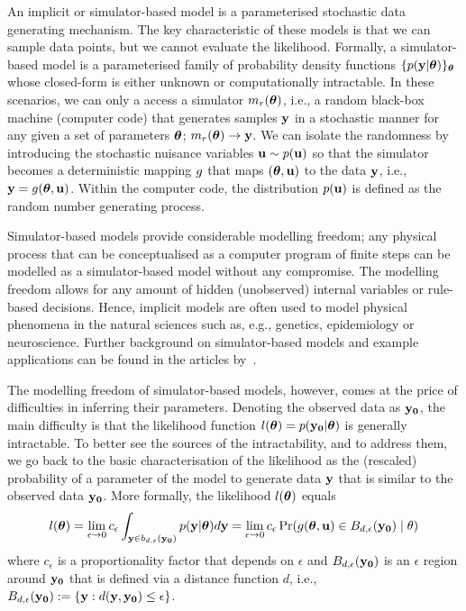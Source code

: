 An implicit or simulator-based model is a parameterised stochastic
data generating mechanism. The key characteristic of these models is
that we can sample data points, but we cannot evaluate the
likelihood. Formally, a simulator-based model is a parameterised
family of probability density functions
\(\{ p(\mathbf{y}|\boldsymbol{\theta}) \}_{\boldsymbol{\theta}}\) whose closed-form is either unknown
or computationally intractable. In these scenarios, we
can only a access a simulator \( m_r(\boldsymbol{\theta}) \), i.e., a random
black-box machine (computer code) that generates samples \(\mathbf{y}\) in a
stochastic manner for any given a set of parameters \(\boldsymbol{\theta}\);
\( m_r(\boldsymbol{\theta}) \rightarrow \mathbf{y} \). We can isolate the randomness by
introducing the stochastic nuisance variables \(\mathbf{u} \sim p(\mathbf{u})\) so
that the simulator becomes a deterministic mapping \(g\) that
maps \((\boldsymbol{\theta}, \mathbf{u})\) to the data \(\mathbf{y}\), i.e., \
\(\mathbf{y}=g(\boldsymbol{\theta},\mathbf{u})\). Within the computer code, the
distribution \(p(\mathbf{u})\) is defined as the random number generating
process.

Simulator-based models provide considerable modelling freedom; any
physical process that can be conceptualised as a computer program of
finite steps can be modelled as a simulator-based model without any
compromise. The modelling freedom allows for any amount of hidden
(unobserved) internal variables or rule-based decisions. Hence,
implicit models are often used to model physical phenomena in the
natural sciences such as, e.g., genetics, epidemiology or
neuroscience. Further background on simulator-based models and
example applications can be found in the articles
by~\citet{gutmann2016, lintusaari2017, sisson2018, cranmer2020}.

The modelling freedom of simulator-based models, however, comes at the
price of difficulties in inferring their parameters. Denoting the
observed data as \(\mathbf{y_0}\), the main difficulty is that the likelihood
function \(l(\boldsymbol{\theta}) = p(\mathbf{y_0}|\boldsymbol{\theta})\) is generally
intractable. To better see the sources of the intractability, and to
address them, we go back to the basic characterisation of the
likelihood as the (rescaled) probability of a parameter of the model
to generate data \(\mathbf{y}\) that is similar to the observed data
\(\mathbf{y_0}\). More formally, the likelihood \(l(\boldsymbol{\theta})\) equals
\begin{equation} \label{eq:likelihood}
  l(\boldsymbol{\theta}) = \lim_{\epsilon \to 0} c_\epsilon \int_{\mathbf{y} \in b_{d,\epsilon}(\mathbf{y_0})} p(\mathbf{y}|\boldsymbol{\theta})d\mathbf{y} =
  \lim_{\epsilon \to 0} c_\epsilon \Pr(g(\boldsymbol{\theta}, \mathbf{u}) \in B_{d,\epsilon}(\mathbf{y_0})  \mid \theta)
\end{equation}
where \(c_\epsilon\) is a proportionality factor that depends on
\(\epsilon\) and \(B_{d,\epsilon}(\mathbf{y_0})\) is an \(\epsilon\) region around \(\mathbf{y_0}\)
that is defined via a distance function \(d\), i.e., \ \(B_{d,\epsilon}(\mathbf{y_0})
:= \{\mathbf{y}: d(\mathbf{y}, \mathbf{y_0}) \leq \epsilon \}\). 

